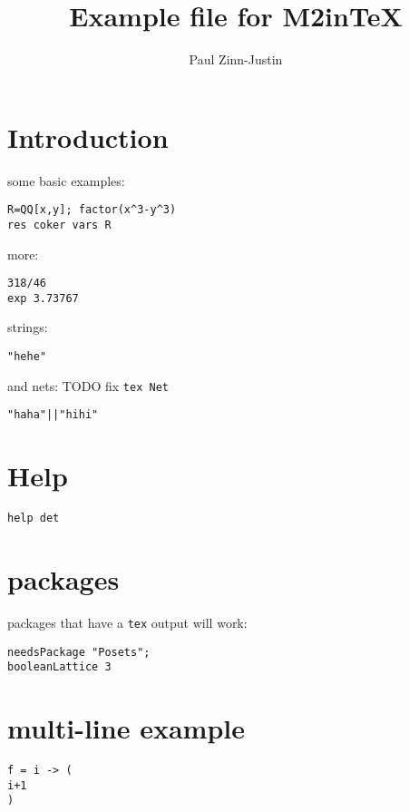 \documentclass[12pt,a4paper]{amsart}
\title{Example file for M2inTeX}
\author{Paul Zinn-Justin}
\begin{document}
\maketitle

\section{Introduction}
some basic examples:
\begin{verbatim}
R=QQ[x,y]; factor(x^3-y^3)
res coker vars R
\end{verbatim}
more:
\begin{verbatim}
318/46
exp 3.73767
\end{verbatim}
strings:
\begin{verbatim}
"hehe"
\end{verbatim}
and nets: TODO fix {\tt tex Net}
\begin{verbatim}
"haha"||"hihi"
\end{verbatim}

\section{Help}
\begin{verbatim}
help det
\end{verbatim}

\section{packages}
packages that have a {\tt tex} output will work:
\begin{verbatim}
needsPackage "Posets";
booleanLattice 3
\end{verbatim}

\section{multi-line example}
\begin{verbatim}
f = i -> (
i+1
)
\end{verbatim}
\end{document}
